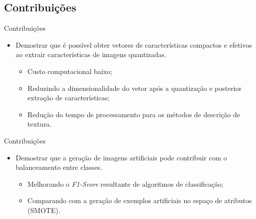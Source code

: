 \documentclass{beamer}
\begin{document}
\subsection{Contribuições}
%
\begin{frame}{Contribuições}
  \setlength\leftmargini{1em}
  \justifying
  \begin{itemize}
    \item Demostrar que é possível obter vetores de características compactos e efetivos ao extrair características de imagens quantizadas.
    \begin{itemize}
      \item Custo computacional baixo;
      \item Reduzindo a dimensionalidade do vetor após a quantização e posterior extração de características;
      \item Redução do tempo de processamento para os métodos de descrição de textura.
    \end{itemize}
  \end{itemize}
\end{frame}
\begin{frame}{Contribuições}
  \setlength\leftmargini{1em}
  \justifying
  \begin{itemize}
    \item Demostrar que a geração de imagens artificiais pode contribuir com o balanceamento entre classes.
    \begin{itemize}
      \item Melhorando o \textit{F1-Score} resultante de algoritmos de classificação;
      \item Comparando com a geração de exemplos artificiais no espaço de atributos (SMOTE).
    \end{itemize}
  \end{itemize}
\end{frame}
\end{document}
